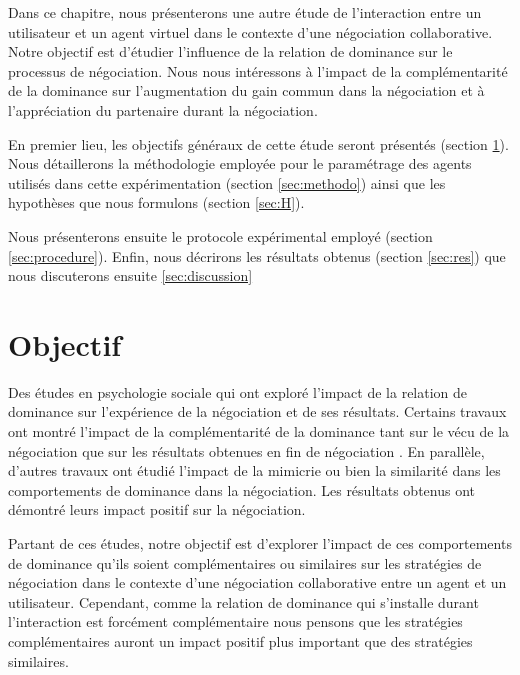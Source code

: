 
Dans ce chapitre, nous présenterons une autre étude de l'interaction entre un utilisateur et un agent virtuel dans le contexte d'une négociation collaborative. 
Notre objectif est d'étudier l'influence de la relation de dominance sur le processus de négociation. Nous nous intéressons à l'impact de la complémentarité de la dominance sur l'augmentation du gain commun dans la négociation et à l'appréciation du partenaire durant la négociation.

En premier lieu, les objectifs généraux de cette étude seront présentés (section \ref{sec:obj}). Nous détaillerons la méthodologie employée pour le paramétrage des agents utilisés dans cette expérimentation (section \ref{sec:methodo}) ainsi que les hypothèses que nous formulons (section \ref{sec:H}).

Nous présenterons ensuite le protocole expérimental employé (section \ref{sec:procedure}). Enfin, nous décrirons les résultats obtenus  (section \ref{sec:res})
que nous discuterons ensuite \ref{sec:discussion}
\section{Objectif}
\label{sec:obj}

Des études en psychologie sociale qui ont exploré l'impact de la relation de dominance sur l'expérience de la négociation et de ses résultats. Certains travaux ont montré l'impact de la complémentarité de la dominance tant sur le vécu de la négociation que sur les résultats obtenues en fin de négociation \cite{tiedens2003power,wiltermuth2009benefits,olekalns2013dyadic}.
En parallèle, d'autres travaux ont étudié l'impact de la mimicrie ou bien la similarité dans les comportements de dominance dans la négociation. Les résultats obtenus ont démontré leurs impact positif sur la négociation.

Partant de ces études, notre objectif est d'explorer l'impact de ces comportements de dominance qu'ils soient complémentaires ou similaires sur les stratégies de négociation dans le contexte d'une négociation collaborative entre un agent et un utilisateur. Cependant, comme la relation de dominance qui s'installe durant l'interaction est forcément complémentaire nous pensons que les stratégies complémentaires auront un impact positif plus important que des stratégies similaires.

